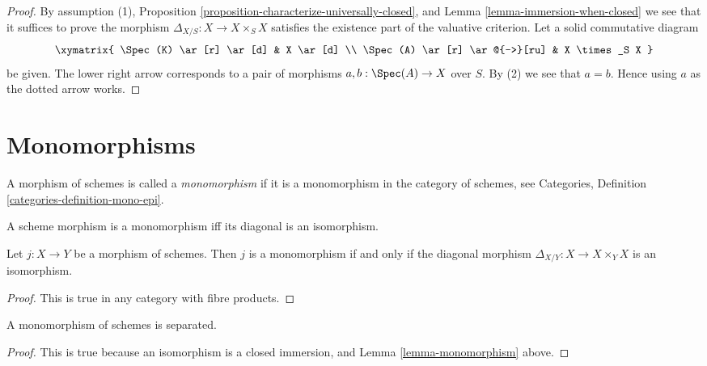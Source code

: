 \begin{proof}
By assumption (1),
Proposition \ref{proposition-characterize-universally-closed},
and Lemma \ref{lemma-immersion-when-closed}
we see that it suffices to prove the morphism
$\Delta_{X/S} : X \to X \times_S X$ satisfies the existence
part of the valuative criterion.
Let a solid commutative diagram
$$
\xymatrix{
\Spec(K) \ar[r] \ar[d] & X \ar[d] \\
\Spec(A) \ar[r] \ar@{-->}[ru] & X \times_S X
}
$$
be given. The lower right arrow corresponds to a
pair of morphisms $a, b : \Spec(A) \to X$ over $S$.
By (2) we see that $a = b$. Hence using $a$ as the dotted
arrow works.
\end{proof}





\section{Monomorphisms}
\label{section-monomorphisms}

\begin{definition}
\label{definition-monomorphism}
A morphism of schemes is called a {\it monomorphism} if it is
a monomorphism in the category of schemes, see
Categories, Definition \ref{categories-definition-mono-epi}.
\end{definition}

\begin{lemma}
\label{lemma-monomorphism}
\begin{slogan}
A scheme morphism is a monomorphism iff its diagonal is an isomorphism.
\end{slogan}
Let $j : X \to Y$ be a morphism of schemes.
Then $j$ is a monomorphism if and only if the
diagonal morphism $\Delta_{X/Y} : X \to X \times_Y X$ is
an isomorphism.
\end{lemma}

\begin{proof}
This is true in any category with fibre products.
\end{proof}

\begin{lemma}
\label{lemma-monomorphism-separated}
A monomorphism of schemes is separated.
\end{lemma}

\begin{proof}
This is true because an isomorphism is a closed immersion,
and Lemma \ref{lemma-monomorphism} above.
\end{proof}

